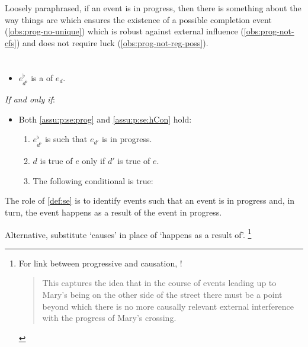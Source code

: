 \begin{note}
  \noindent%
  Loosely paraphrased, if an event is in progress, then there is something about the way things are which ensures the existence of a possible completion event (\autoref{obs:prog-no-unique}) which is robust against external influence (\autoref{obs:prog-not-cfs}) and does not require luck (\autoref{obs:prog-not-reg-poss}).
\end{note}


\section{}

\begin{note}
  \begin{definition}[\se{3}]
    \label{def:se}
    \vspace{-\baselineskip}
    \begin{itemize}
    \item
      \(e^{\flat}_{d^{\flat}}\) is a \emph{} of \(e_{d}\).
    \end{itemize}
    \emph{If and only if}:
    \begin{itemize}
    \item
      Both \ref{assu:p:se:prog} and \ref{assu:p:se:hCon} hold:
    \begin{enumerate}[label=\arabic*., ref=(\arabic*)]
    \item
      \label{assu:p:se:prog}
      \(e^{\flat}_{d^{\flat}}\) is such that \(e_{d'}\) is in progress.
    \item
      \(d\) is true of \(e\) only if \(d'\) is true of \(e\).
    \item
      \label{assu:p:se:hCon}
      The following conditional is true:
    \end{enumerate}
  \end{itemize}
  \vspace{-\baselineskip}
  \end{definition}

  \noindent%
  The role of \autoref{def:se} is to identify events such that an event is in progress and, in turn, the event happens as a result of the event in progress.

  Alternative, substitute `causes' in place of `happens as a result of'.%
  \footnote{
    For link between progressive and causation, \textcite{Szabo:2004ul}!

    \begin{quote}
      This captures the idea that in the course of events leading up to Mary’s being on the other side of the street there must be a point beyond which there is no more causally relevant external interference with the progress of Mary’s crossing.
    \end{quote}
  }
\end{note}


